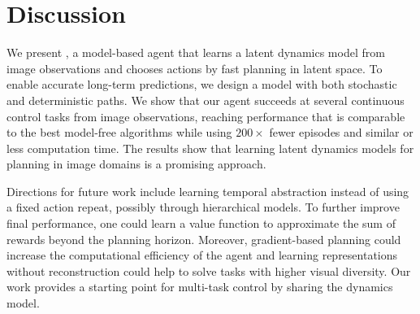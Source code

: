 \section{Discussion}
\label{discussion}

We present \method, a model-based agent that learns a latent dynamics model from image observations and chooses actions by fast planning in latent space. To enable accurate long-term predictions, we design a model with both stochastic and deterministic paths. We show that our agent succeeds at several continuous control tasks from image observations, reaching performance that is comparable to the best model-free algorithms while using $200\times$ fewer episodes and similar or less computation time. The results show that learning latent dynamics models for planning in image domains is a promising approach.

Directions for future work include learning temporal abstraction instead of using a fixed action repeat, possibly through hierarchical models. To further improve final performance, one could learn a value function to approximate the sum of rewards beyond the planning horizon. Moreover, gradient-based planning could increase the computational efficiency of the agent and learning representations without reconstruction could help to solve tasks with higher visual diversity. Our work provides a starting point for multi-task control by sharing the dynamics model.